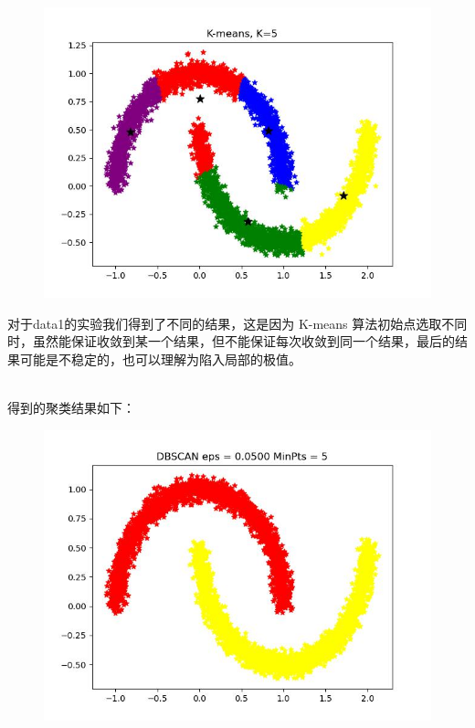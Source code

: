 \documentclass[UTF8]{ctexart}
\begin{document}
\begin{figure}[H]
\begin{minipage}{0.32\linewidth}
		\includegraphics[width=0.9\linewidth]{no1-3.jpg}
	\end{minipage}

\end{figure}

对于data1的实验我们得到了不同的结果，这是因为 K-means 算法初始点选取不同时，虽然能保证收敛到某一个结果，但不能保证每次收敛到同一个结果，最后的结果可能是不稳定的，也可以理解为陷入局部的极值。\\

\noindent \textbf{}\\


\noindent \textbf{}

得到的聚类结果如下：

\begin{figure}[H]
  \centering
  \includegraphics[scale=0.46]{data1.jpg}
\end{figure}
\end{document}
